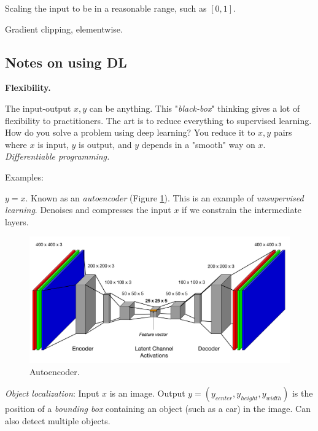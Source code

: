 \documentclass[english]{article}
\begin{document}
\item Scaling the input to be in a reasonable range, such as $[0,1]$.

\item Gradient clipping, elementwise. 


\eenum

\subsection{Notes on using DL}
\benum


\item  {\bf Flexibility.}

The input-output $x,y$ can be anything. This "\emph{black-box}" thinking gives a lot of flexibility to practitioners. The art is to reduce everything to supervised learning. How do you solve a problem using deep learning? You reduce it to $x,y$ pairs where $x$ is input, $y$ is output, and $y$ depends in a "smooth" way on $x$. \emph{Differentiable programming.}

 Examples:

\benum

\item
$y = x$. Known as an \emph{autoencoder} (Figure \ref{ae}). This is an example of \emph{unsupervised learning}. Denoises and compresses the input $x$ if we constrain the intermediate layers. 

\begin{figure}
  \centering
  \includegraphics[scale=0.3]{ae.png}
  \caption{Autoencoder.}
  \label{ae}
\end{figure}




\item 
\emph{Object localization}: Input $x$ is an image. Output $y = (y_{center}, y_{height}, y_{width})$ is the position of a \emph{bounding box} containing an object (such as a car) in the image. Can also detect multiple objects.
 
\end{document}
